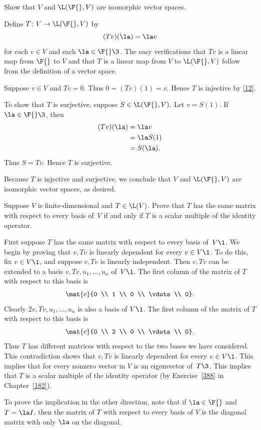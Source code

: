 \exercise
Show that $V$ and $\L(\F{}, V)$ are isomorphic vector spaces.

\begin{Solution}
Define $T \colon V \to \L(\F{}, V)$ by
\[
(Tv)(\la) = \la v
\]
for each $v \in V$ and each $\la \in \F{}\3$. The easy verifications that $Tv$ is a linear map from $\F{}$ to $V$ and that $T$ is a linear map from $V$ to $\L(\F{}, V)$ follow from the definition of a vector space.

Suppose $v \in V$ and $Tv = 0$. Thus $0 = (Tv)(1) = v$. Hence $T$ is injective by \ref{12}.

To show that $T$ is surjective, suppose $S \in \L(\F{}, V)$. Let $v = S(1)$. If $\la \in \F{}\3$, then
\begin{align*}
(Tv)(\la) &= \la v \\
&= \la S(1) \\
&= S(\la).
\end{align*}
Thus $S = Tv$. Hence $T$ is surjective.

Because $T$ is injective and surjective, we conclude that $V$ and $\L(\F{}, V)$ are isomorphic vector spaces, as desired.
\end{Solution}

\exercise
Suppose $V$ is finite-dimensional and $T \in \L(V)$. Prove that $T$ has the same matrix with respect to every basis of~$V$ if and only if $T$ is a scalar multiple of the identity operator.

\begin{Solution}
First suppose $T$ has the same matrix with respect to every basis of~$V\1$.
We begin by proving that $v,Tv$ is linearly dependent for every
$v \in V\1$.  To do this, fix $v \in V\1$, and suppose $v, Tv$ is linearly
independent.  Then $v, Tv$ can be extended to a basis $v, Tv, u_1, \dots, u_n$
of~$V\1$.  The first column of the matrix of $T$ with respect to this basis is
\[
\mat{c}{0 \\ 1 \\ 0 \\ \vdots \\ 0}.
\]
Clearly $2v, Tv, u_1, \dots, u_n$ is also a basis of $V\1$.
The first column of the matrix of $T$ with respect to this basis is
\[
\mat{c}{0 \\ 2 \\ 0 \\ \vdots \\ 0}.
\]
Thus $T$ has different matrices with respect to the two bases we have considered.
This contradiction shows that $v,Tv$ is linearly dependent for every $v \in V\1$.
This implies that for every nonzero vector in $V$ is an eigenvector of~$T\3$.  This implies
that $T$ is a scalar multiple of the identity operator (by Exercise~\ref{388} in
Chapter~\ref{182}).

To prove the implication in the other direction, note that if $\la \in \F{}$ and $T = \la I$, then the matrix of $T$ with respect to every basis of $V$ is the diagonal matrix with only $\la$ on the diagonal.
\end{Solution}

